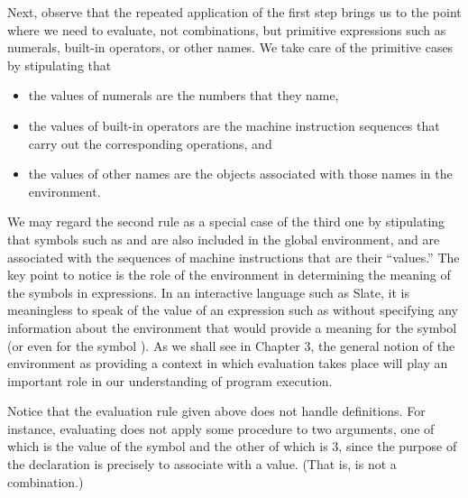 Next, observe that the repeated application of the first step brings us to the point where we need to evaluate, not combinations, but primitive expressions such as numerals, built-in operators, or other names. We take care of the primitive cases by stipulating that

\begin{itemize}
\item the values of numerals are the numbers that they name,
\item the values of built-in operators are the machine instruction sequences that carry out the corresponding operations, and
\item the values of other names are the objects associated with those names in the environment.
\end{itemize}

We may regard the second rule as a special case of the third one by stipulating that symbols such as \slate{+} and \slate{*} are also included in the global environment, and are associated with the sequences of machine instructions that are their ``values.'' The key point to notice is the role of the environment in determining the meaning of the symbols in expressions. In an interactive language such as Slate, it is meaningless to speak of the value of an expression such as  without specifying any information about the environment that would provide a meaning for the symbol  (or even for the symbol \slate{+}). As we shall see in Chapter 3, the general notion of the environment as providing a context in which evaluation takes place will play an important role in our understanding of program execution.

Notice that the evaluation rule given above does not handle definitions. For instance, evaluating  does not apply some procedure to two arguments, one of which is the value of the symbol  and the other of which is 3, since the purpose of the  declaration is precisely to associate  with a value. (That is,  is not a combination.)

